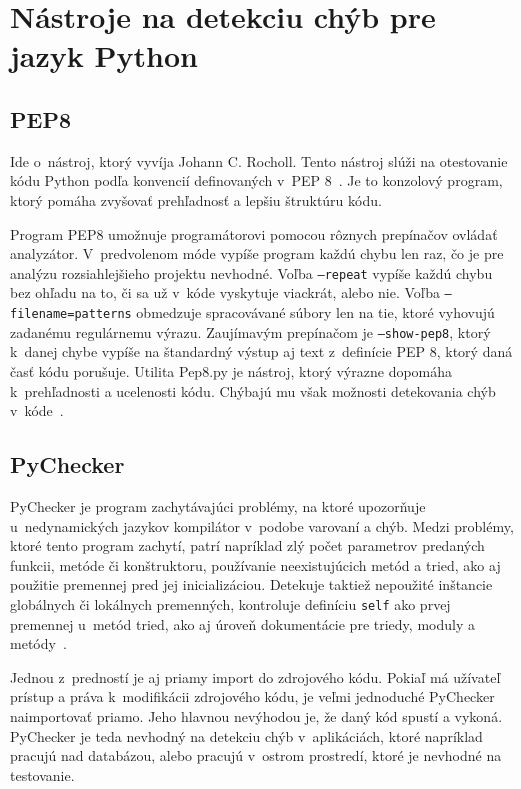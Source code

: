 \documentclass[11pt,oneside,final]{fithesis2}
\begin{document}
	\section{Nástroje na detekciu chýb pre jazyk Python}	


\subsection{PEP8}
	Ide o~nástroj, ktorý vyvíja Johann C. Rocholl. Tento nástroj slúži na otestovanie kódu Python podľa konvencií definovaných v~PEP 8~\cite{pep8}. Je to konzolový program, ktorý pomáha zvyšovať prehľadnosť a lepšiu štruktúru kódu. 
	
	Program PEP8 umožnuje programátorovi pomocou rôznych prepínačov ovládať analyzátor. V~predvolenom móde vypíše program každú chybu len raz, čo je pre analýzu rozsiahlejšieho projektu nevhodné. Voľba \texttt{–repeat} vypíše každú chybu bez ohľadu na to, či sa už v~kóde vyskytuje viackrát, alebo nie. Voľba \texttt{–filename=patterns} obmedzuje spracovávané súbory len na tie, ktoré vyhovujú zadanému regulárnemu výrazu. Zaujímavým prepínačom je \texttt{–show-pep8}, ktorý k~danej chybe vypíše na štandardný výstup aj text z~definície PEP 8, ktorý daná časť kódu porušuje.
    Utilita Pep8.py je nástroj, ktorý výrazne dopomáha k~prehľadnosti a ucelenosti kódu. Chýbajú mu však možnosti detekovania chýb v~kóde~\cite{pep8}.

\subsection{PyChecker}

	PyChecker je program zachytávajúci problémy, na ktoré upozorňuje u~nedynamických jazykov kompilátor v~podobe varovaní a chýb. Medzi problémy, ktoré tento program zachytí, patrí napríklad zlý počet parametrov predaných funkcii, metóde či konštruktoru, používanie neexistujúcich metód a tried, ako aj použitie premennej pred jej inicializáciou. Detekuje taktiež nepoužité inštancie globálnych či lokálnych premenných, kontroluje definíciu \texttt{self} ako prvej premennej u~metód tried, ako aj úroveň dokumentácie pre triedy, moduly a metódy~\cite{pychecker}. 
	
	Jednou z~predností je aj priamy import do zdrojového kódu. Pokiaľ má užívateľ prístup a práva k~modifikácii zdrojového kódu, je veľmi jednoduché PyChecker naimportovať priamo. Jeho hlavnou nevýhodou je, že daný kód spustí a vykoná. PyChecker je teda nevhodný na detekciu chýb v~aplikáciách, ktoré napríklad pracujú nad databázou, alebo pracujú v~ostrom prostredí, ktoré je nevhodné na testovanie.
\end{document}
